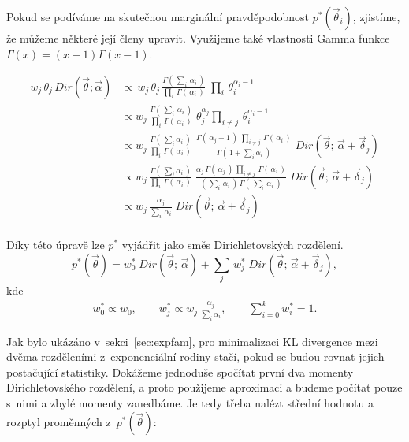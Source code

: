 Pokud se podíváme na skutečnou marginální pravděpodobnost
$p^*(\vec{\theta}_i)$, zjistíme, že můžeme některé její členy upravit.
Využijeme také vlastnosti Gamma funkce $\Gamma(x) = (x-1) \Gamma(x-1)$.

\begin{align}
w_j \, \theta_j \, Dir(\vec{\theta}; \vec{\alpha}) &\propto \,
    w_j \, \theta_j \, \frac{\Gamma (\, \sum_i \, \alpha_{i} \,)}{\prod_i \, \Gamma(\,\alpha_i\,)}\;
    \prod_i \, \theta_{i}^{\alpha_{i} - 1}
\label{eq:4}
\\
&\propto w_j \, \frac{\Gamma (\,\sum_i \, \alpha_{i}\,)} {\prod_i \,
    \Gamma(\,\alpha_{i}\,)} \; \theta_j^{\alpha_j} \prod_{i \ne j} \,
    \theta_{i}^{\alpha_{i} - 1} \\
&\propto w_j \,
    \frac{\Gamma (\,\sum_i \alpha_{i}\,)}
         {\prod_i \, \Gamma(\, \alpha_{i} \,)} \;
    \frac{\Gamma(\, \alpha_{j} + 1 \,) \; \prod_{i \ne j} \, \Gamma(\,\alpha_i\,)}
         {\Gamma (\,1 + \sum_i \alpha_i\,)} \;
    Dir(\vec\theta; \, \vec{\alpha} + \vec{\delta}_j) \\
&\propto w_j \,
    \frac{\Gamma (\,\sum_i \alpha_{i}\,)}
         {\prod_i \, \Gamma(\, \alpha_{i}\,)} \;
    \frac{\alpha_j \, \Gamma(\,\alpha_j\,) \, \prod_{i \ne j} \, \Gamma(\,\alpha_i\,)}
         {(\,\sum_i \, \alpha_i\,) \, \Gamma (\,\sum_i \,\alpha_i\,)}\;
    Dir(\vec\theta; \,\vec{\alpha} + \vec{\delta}_j) \\
&\propto w_j \,
    \frac{\alpha_j}
         {\sum_i \, \alpha_i} \;
    Dir(\vec\theta; \,\vec{\alpha} + \vec{\delta}_j) \\
\end{align}

Díky této úpravě lze $p^*$ vyjádřit jako směs Dirichletovských rozdělení.
\begin{equation}
p^*(\vec{\theta}) =
    w_0^* \; Dir(\vec{\theta};\, \vec{\alpha}) +
    \sum_j \, w^*_j \;
        Dir(\vec{\theta};\, \vec{\alpha} + \vec{\delta}_j),
\label{eq:marginaltheta}
\end{equation}
kde
\begin{align}
    w^*_0 \propto w_0, \quad \quad
    w^*_j \propto w_j \, \frac{\alpha_j}{\sum_i \alpha_i}, \quad \quad
    \sum_{i=0}^k w_i^* = 1.
\end{align}

Jak bylo ukázáno v~sekci~\ref{sec:expfam}, pro minimalizaci KL divergence mezi dvěma rozděleními z~exponenciální rodiny
stačí, pokud se budou rovnat jejich postačující statistiky. Dokážeme jednoduše
spočítat první dva momenty Dirichletovského rozdělení, a proto použijeme
aproximaci a budeme počítat pouze s~nimi a zbylé momenty zanedbáme.
Je tedy třeba nalézt střední hodnotu a rozptyl proměnných z~$p^*(\vec\theta)$:

